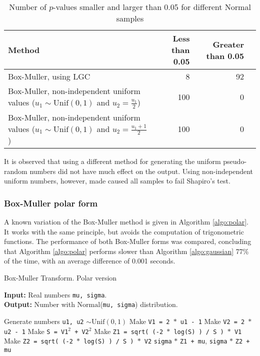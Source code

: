\documentclass[letterpaper, 10 pt, conference]{article}
\begin{document}
\begin{table}
	\centering
	\caption{Number of $p$-values smaller and larger than 0.05 for different Normal samples}
	\begin{tabular}{l r r r}
		\hline
		Method &Less than 0.05 & Greater than 0.05 \\ 
		\hline
		Box-Muller, using \textsc{LGC}  & 8 & 92 \\ 
		Box-Muller, non-independent uniform values ($u_1 \sim \mathrm{Unif}(0,1)$ and  $u_2 = \frac{u_1}{2}$) &  100 & 0 \\ 
		Box-Muller, non-independent uniform values ($u_1 \sim \mathrm{Unif}(0,1)$ and  $u_2 = \frac{u_1 + 1}{2}$) &  100 & 0 \\
		\hline
	\end{tabular}
	\label{tab:pvalues_gaussian_variations}
\end{table}

It is observed that using a different method for generating the uniform pseudo-random numbers did not have much effect on the output. Using non-independent uniform numbers, however, made caused all samples to fail Shapiro's test.

\subsubsection{Box-Muller polar form}
A known variation of the Box-Muller method \cite{Ross_2000} is given in Algorithm \ref{algo:polar}. It works with the same principle, but avoids the computation of trigonometric functions. The performance of both Box-Muller forms was compared, concluding that Algorithm \ref{algo:polar} performs slower than Algorithm \ref{algo:gaussian}  77\% of the time, with an average difference of 0.001 seconds. 

\begin{algorithm}
	\caption{Box-Muller Transform. Polar version}
	\begin{flushleft}
		\textbf{Input: } Real numbers \texttt{mu, sigma}.
		\\ \textbf{Output: } Number with $\mathrm{Normal}$(\texttt{mu, sigma}) distribution.
	\end{flushleft}
	
	\begin{algorithmic}[1]
		\Repeat
		\State Generate numbers \texttt{u1, u2} $\sim \mathrm{Unif}(0,1)$
		\State Make \texttt{V1 = 2 $\ast$ u1 - 1}
		\State Make \texttt{V2 = 2 $\ast$ u2 - 1}
		\State Make \texttt{S = V1$^2$ + V2$^2$}
		\State Make \texttt{Z1 = sqrt( (-2 $\ast$ log(S) ) / S ) $\ast$ V1}
		\State Make \texttt{Z2 = sqrt( (-2 $\ast$ log(S) ) / S ) $\ast$ V2} 
		\State \Return \texttt{sigma} $\ast$ \texttt{Z1 + mu}, \texttt{sigma} $\ast$ \texttt{Z2 + mu}
	\end{algorithmic}
	\label{algo:polar}
\end{algorithm}
\end{document}
